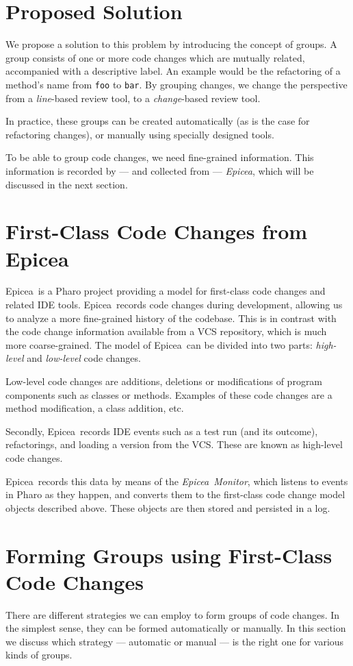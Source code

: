 \documentclass[conference,a4paper]{IEEEtran}
\newcommand{\Ep}{Epicea}
\newcommand{\code}[1]{\texttt{#1}}
\begin{document}
\section{Proposed Solution}
\label{sec:proposed-solution}
We propose a solution to this problem by introducing the concept of
groups. A group consists of one or more code changes which are
mutually related, accompanied with a descriptive label. An example
would be the refactoring of a method's name from \code{foo} to
\code{bar}. By grouping changes, we change the perspective from a
\textit{line}-based review tool, to a \textit{change}-based review
tool.

In practice, these groups can be created automatically (as is the case
for refactoring changes), or manually using specially designed tools.

To be able to group code changes, we need fine-grained
information. This information is recorded by --- and collected from
--- \textit{\Ep}, which will be discussed in the next section.

\section{First-Class Code Changes from \Ep}
\label{sec:first-class-ide}
\Ep\ is a Pharo project providing a model for first-class code changes
and related IDE tools. \Ep\ records code changes during development,
allowing us to analyze a more fine-grained history of the
codebase. This is in contrast with the code change information
available from a VCS repository, which is much more
coarse-grained. The model of \Ep\ can be divided into two parts:
\textit{high-level} and \textit{low-level} code changes.

Low-level code changes are additions, deletions or modifications of
program components such as classes or methods. Examples of these code
changes are a method modification, a class addition, etc.

Secondly, \Ep\ records IDE events such as a test run (and its
outcome), refactorings, and loading a version from the VCS. These are
known as high-level code changes.

\Ep\ records this data by means of the \textit{\Ep\ Monitor}, which
listens to events in Pharo as they happen, and converts them to the
first-class code change model objects described above. These objects
are then stored and persisted in a log.

\section{Forming Groups using First-Class Code Changes}
\label{sec:code-review-using}
There are different strategies we can employ to form groups of code
changes. In the simplest sense, they can be formed automatically or
manually. In this section we discuss which strategy --- automatic or
manual --- is the right one for various kinds of groups.
\end{document}
